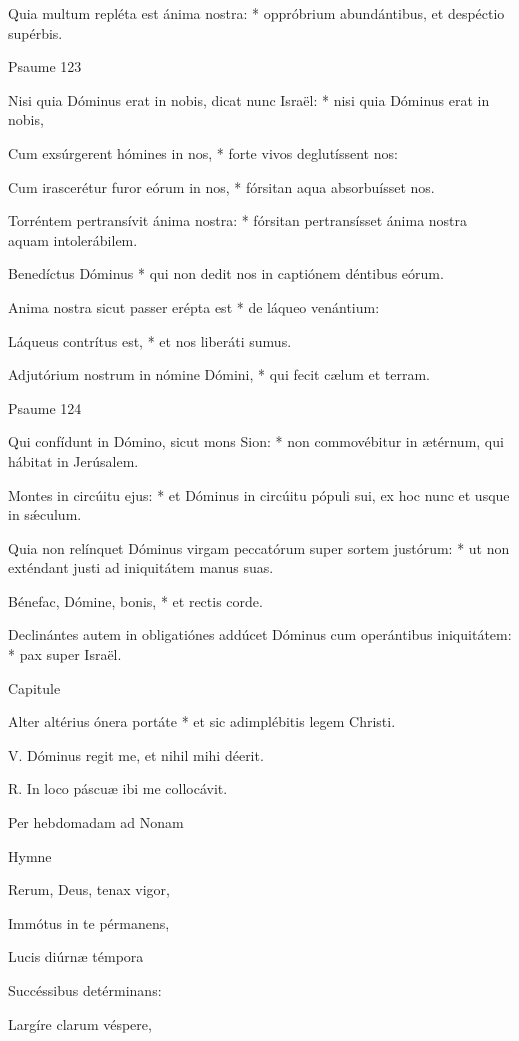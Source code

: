 Quia multum repléta est ánima nostra: * oppróbrium abundántibus, et despéctio supérbis.


Psaume 123

Nisi quia Dóminus erat in nobis, dicat nunc Israël: * nisi quia Dóminus erat in nobis,

Cum exsúrgerent hómines in nos, * forte vivos deglutíssent nos:

Cum irascerétur furor eórum in nos, * fórsitan aqua absorbuísset nos.

Torréntem pertransívit ánima nostra: * fórsitan pertransísset ánima nostra aquam intolerábilem.

Benedíctus Dóminus * qui non dedit nos in captiónem déntibus eórum.

Anima nostra sicut passer erépta est * de láqueo venántium:

Láqueus contrítus est, * et nos liberáti sumus.

Adjutórium nostrum in nómine Dómini, * qui fecit cælum et terram.


Psaume 124

Qui confídunt in Dómino, sicut mons Sion: * non commovébitur in ætérnum, qui hábitat in Jerúsalem.

Montes in circúitu ejus: * et Dóminus in circúitu pópuli sui, ex hoc nunc et usque in sǽculum.

Quia non relínquet Dóminus virgam peccatórum super sortem justórum: * ut non exténdant justi ad iniquitátem manus suas.

Bénefac, Dómine, bonis, * et rectis corde.

Declinántes autem in obligatiónes addúcet Dóminus cum operántibus iniquitátem: * pax super Israël.


Capitule

Alter altérius ónera portáte * et sic adimplébitis legem Christi.


V. Dóminus regit me, et nihil mihi déerit.

R. In loco páscuæ ibi me collocávit.





Per hebdomadam ad Nonam


Hymne

Rerum, Deus, tenax vigor,

Immótus in te pérmanens,

Lucis diúrnæ témpora

Succéssibus detérminans:


Largíre clarum véspere,

